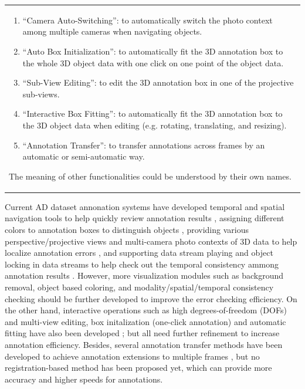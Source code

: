 \documentclass[letterpaper, 10 pt, conference]{ieeeconf}  %
\begin{document}
\begin{table}[h]
\begin{tabular}{p{17.5cm}}
\begin{enumerate}
			\item ``Camera Auto-Switching'': to automatically switch the photo context among multiple cameras when navigating objects.
			
			\item ``Auto Box Initialization'': to automatically fit the 3D annotation box to the whole 3D object data with one click on one point of the object data.
			
			\item ``Sub-View Editing'': to edit the 3D annotation box in one of the projective sub-views.
			
			\item ``Interactive Box Fitting'': to automatically fit the 3D annotation box to the 3D object data when editing (e.g. rotating, translating, and resizing).
			
			\item ``Annotation Transfer'': to transfer annotations across frames by an automatic or semi-automatic way.
			
		\end{enumerate}
		The meaning of other functionalities could be understood by their own names.
		
		
		
	\end{tabular}
	\label{tab:annotationMethods}
	\vspace{-0.5cm}
\end{table}




Current AD dataset annonation systems have developed temporal and spatial navigation tools to help quickly review annotation results \cite{Playment,SUPERVISELY,Wang2019LATTEAL,Zimmer20193DBA}, 
assigning different colors to annotation boxes to distinguish objects \cite{SUPERVISELY,Zimmer20193DBA,Playment,scale}, 
providing various perspective/projective views and multi-camera photo contexts of 3D data to help localize annotation errors \cite{SUPERVISELY,Playment,Zimmer20193DBA}, 
and supporting data stream playing and object locking in data streams to help check out the temporal consistency ammong annotation results \cite{Playment}.
However, more visualization modules such as background removal, object based coloring, and modality/spatial/temporal consistency checking should be further developed to improve the error checking efficiency.
On the other hand, interactive operations such as high degrees-of-freedom (DOFs) and multi-view editing, box initalization (one-click annotation)
and automatic fitting have also been developed \cite{pointatme,Zimmer20193DBA,Wang2019LATTEAL,SUPERVISELY,Playment}; but all need further refinement to increase annotation efficiency. 
Besides, several annotation transfer methods have been developed to achieve annotation extensions to multiple frames \cite{Playment,Wang2019LATTEAL,Zimmer20193DBA}, 
but no registration-based method has been proposed yet, which can provide more accuracy and higher speeds for annotations.
\end{document}
